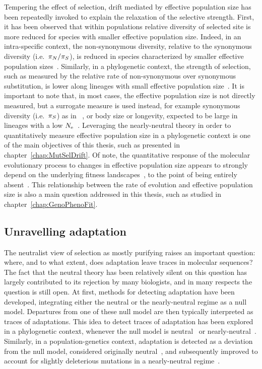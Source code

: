 Tempering the effect of selection, drift mediated by effective population size has been repeatedly invoked to explain the relaxation of the selective strength.
First, it has been observed that within populations relative diversity of selected site is more reduced for species with smaller effective population size.
Indeed, in an intra-specific context, the non-synonymous diversity, relative to the synonymous diversity (i.e.~$\pi_N / \pi_S$), is reduced in species characterized by smaller effective population sizes~\citep{Piganeau2009, Elyashiv2010, Galtier2016, Chen2017, James2017}.
Similarly, in a phylogenetic context, the strength of selection, such as measured by the relative rate of non-synonymous over synonymous substitution, is lower along lineages with small effective population size~\citep{Ohta1993, Ohta1995, Moran1996, Woolfit2003, Woolfit2005, Popadin2007}.
It is important to note that, in most cases, the effective population size is not directly measured, but a surrogate measure is used instead, for example synonymous diversity (i.e.~$\pi_S$) as in ~\citep{Galtier2016}, or body size or longevity, expected to be large in lineages with a low $N_{\text{e}}$~\citep{Romiguier2014}.
Leveraging the nearly-neutral theory in order to quantitatively measure effective population size in a phylogenetic context is one of the main objectives of this thesis, such as presented in chapter~\ref{chap:MutSelDrift}.
Of note, the quantitative response of the molecular evolutionary process to changes in effective population size appears to strongly depend on the underlying fitness landscapes~\citep{Welch2008}, to the point of being entirely absent~\citep{Cherry1998, Goldstein2013}.
This relationship between the rate of evolution and effective population size is also a main question addressed in this thesis, such as studied in chapter~\ref{chap:GenoPhenoFit}.

\subsection{Unravelling adaptation}
\label{subsec:where-is-adaptation?}

The neutralist view of selection as mostly purifying raises an important question: where, and to what extent, does adaptation leave traces in molecular sequences?
The fact that the neutral theory has been relatively silent on this question has largely contributed to its rejection by many biologists, and in many respects the question is still open.
At first, methods for detecting adaptation have been developed, integrating either the neutral or the nearly-neutral regime as a null model.
Departures from one of these null model are then typically interpreted as traces of adaptations.
This idea to detect traces of adaptation has been explored in a phylogenetic context, whenever the null model is neutral~\citep{Goldman1994, Muse1994, Yang2002, Zhang2004} or nearly-neutral~\citep{Rodrigue2016, Bloom2017}.
Similarly, in a population-genetics context, adaptation is detected as a deviation from the null model, considered originally neutral~\citep{McDonald1991, Charlesworth1994, Smith2002}, and subsequently improved to account for slightly deleterious mutations in a nearly-neutral regime~\citep{eyre-walker_estimating_2009, Galtier2016}.

